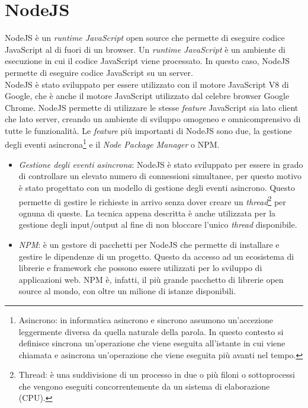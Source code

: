 \section{NodeJS}\label{sec:NodeJS}
NodeJS è un \textit{runtime JavaScript} open source che permette di eseguire codice JavaScript al di fuori di un browser\cite{NodeJS}. Un \textit{runtime JavaScript} è un ambiente
di esecuzione in cui il codice JavaScript viene processato. In questo caso, NodeJS permette di eseguire codice JavaScript su un server.\\
NodeJS è stato sviluppato per essere utilizzato con il motore JavaScript V8 di Google, che è anche il motore JavaScript utilizzato dal celebre browser Google Chrome. NodeJS permette 
di utilizzare le stesse \textit{feature} JavaScript sia lato client che lato server, creando un ambiente di sviluppo omogeneo e omnicomprensivo di tutte le funzionalità. Le 
\textit{feature} più importanti di NodeJS sono due, la gestione degli eventi asincrona\footnote{Asincrono: in informatica asincrono e sincrono assumono un'accezione leggermente 
diversa da quella naturale della parola. In questo contesto si definisce sincrona un'operazione che viene eseguita all'istante in cui viene chiamata e asincrona un'operazione che 
viene eseguita più avanti nel tempo.} e il \textit{Node Package Manager} o NPM.
\begin{itemize}
    \item \textit{Gestione degli eventi asincrona}: NodeJS è stato sviluppato per essere in grado di controllare un elevato numero di connessioni simultanee, per questo motivo è 
    stato progettato con un modello di gestione degli eventi asincrono. Questo permette di gestire le richieste in arrivo senza dover creare un \textit{thread}\footnote{
        Thread: è una suddivisione di un processo in due o più filoni o sottoprocessi che vengono eseguiti concorrentemente da un sistema di elaborazione (CPU).
    } per ognuna di queste. La tecnica appena descritta è anche utilizzata per la gestione degli input/output al fine di non bloccare l'unico \textit{thread} disponibile.
    \item \textit{NPM}: è un gestore di pacchetti per NodeJS che permette di installare e gestire le dipendenze di un progetto. Questo da accesso ad un ecosistema di
    librerie e framework che possono essere utilizzati per lo sviluppo di applicazioni web. NPM è, infatti, il più grande pacchetto di librerie open source al mondo, con oltre un 
    milione di istanze disponibili.
\end{itemize}
